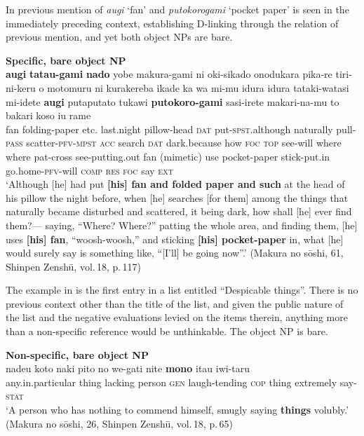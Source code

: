 \documentclass[output=paper]{LSP/langsci}
\begin{document}
In  previous mention of \textit{augi} ‘fan’ and \textit{putokorogami} ‘pocket paper’ is seen in the immediately preceding context, establishing D-linking through the relation of previous mention, and yet both object NPs are bare. 

\begin{exe}
\ex
\label{07-fr-ex:33}
\textbf{Specific, bare object NP}\\
\gll \textbf{augi} \textbf{tatau-gami} \textbf{nado} yobe makura-gami ni oki-sikado onodukara pika-re tiri-ni-keru o motomuru ni kurakereba ikade ka wa mi-mu idura idura tataki-watasi mi-idete \textbf{augi} putaputato tukawi \textbf{putokoro-gami} sasi-irete makari-na-mu to bakari koso iu rame\\
fan folding-paper etc.  last.night pillow-head \textsc{dat} put-\textsc{spst}.although naturally pull-\textsc{pass} scatter-\textsc{pfv}-\textsc{mpst} \textsc{acc} search \textsc{dat} dark.because how \textsc{foc} \textsc{top} see-will where where pat-cross see-putting.out  fan (mimetic) use  pocket-paper stick-put.in go.home-\textsc{pfv}-will \textsc{comp} \textsc{res} \textsc{foc} say \textsc{ext}\\
\glt ‘Although [he] had put \textbf{[his] fan and folded paper and such} at the head of his pillow the night before, when [he] searches [for them] among the things that naturally became disturbed and scattered, it being dark, how shall [he] ever find them?— saying, “Where? Where?” patting the whole area, and finding them, [he] uses \textbf{[his] fan}, “woosh-woosh,” and sticking \textbf{[his] pocket-paper} in, what [he] would surely say is something like, “[I'll] be going now”.’  (Makura no sōshi, 61, Shinpen Zenshū, vol.\,18, p.\,117)
\end{exe}

The example in  is the first entry in a list entitled ``Despicable things''. There is no previous context other than the title of the list, and given the public nature of the list and the negative evaluations levied on the items therein, anything more than a non-specific reference would be unthinkable. The object NP is bare. 

\begin{exe}
\ex
\label{07-fr-ex:34}
\textbf{Non-specific, bare object NP}\\
\gll nadeu koto naki pito no we-gati nite \textbf{mono} itau iwi-taru\\
any.in.particular thing lacking person \textsc{gen} laugh-tending \textsc{cop}  thing extremely say-\textsc{stat}\\
\glt ‘A person who has nothing to commend himself, smugly saying \textbf{things} volubly.’  (Makura no sōshi, 26, Shinpen Zenshū, vol.\,18, p.\,65)
\end{exe}
\end{document}
